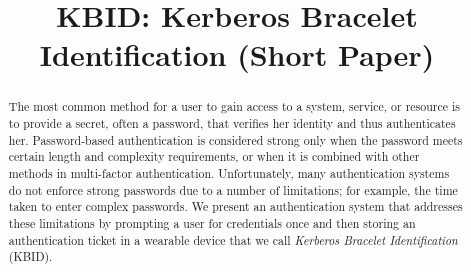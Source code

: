 \documentclass[runningheads,a4paper]{llncs}
\begin{document}
%

\title{KBID: Kerberos Bracelet Identification (Short Paper)}


%

			
\maketitle

\begin{abstract}
The most common method for a user to gain access to a system, service, or resource is to provide a secret, often a password, that verifies her identity and thus authenticates her. Password-based authentication is considered strong only when the password meets certain length and complexity requirements, or when it is combined with other methods in multi-factor authentication. Unfortunately, many authentication systems do not enforce strong passwords due to a number of limitations; for example, the time taken to enter complex passwords. We present an authentication system that addresses these limitations by prompting a user for credentials once and then storing an authentication ticket in a wearable device that we call \textit{Kerberos Bracelet Identification} (KBID).  
\end{abstract}


\end{document}
